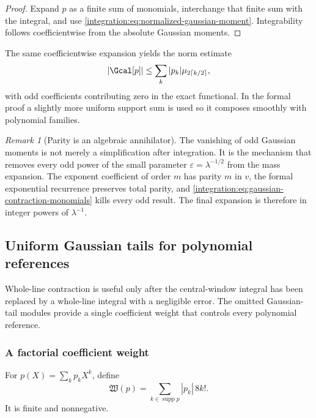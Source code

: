 \documentclass[11pt,oneside]{article}
\theoremstyle{definition}
\theoremstyle{remark}
\newtheorem{remark}[remark]{Remark}
\newcommand{\supp}{\operatorname{supp}}
\begin{document}
\begin{proof}
Expand $p$ as a finite sum of monomials, interchange that finite sum with the integral, and
use \eqref{integration:eq:normalized-gaussian-moment}.  Integrability follows coefficientwise from the
absolute Gaussian moments.
\end{proof}

The same coefficientwise expansion yields the norm estimate
\begin{equation}
 \left|\Gcal[p]\right|
 \le\sum_k|p_k|\mu_{2\lceil k/2\rceil},
 \label{integration:eq:gaussian-contraction-norm-bound}
\end{equation}
with odd coefficients contributing zero in the exact functional.  In the formal proof a
slightly more uniform support sum is used so it composes smoothly with polynomial families.

\begin{remark}[Parity is an algebraic annihilator]
The vanishing of odd Gaussian moments is not merely a simplification after integration.  It
is the mechanism that removes every odd power of the small parameter $\varepsilon=
\lambda^{-1/2}$ from the mass expansion.  The exponent coefficient of order $m$ has parity
$m$ in $v$, the formal exponential recurrence preserves total parity, and
\eqref{integration:eq:gaussian-contraction-monomials} kills every odd result.  The final expansion is
therefore in integer powers of $\lambda^{-1}$.
\end{remark}

\subsection{Uniform Gaussian tails for polynomial references}
\label{integration:sec:gaussian-tails}

Whole-line contraction is useful only after the central-window integral has been replaced by
a whole-line integral with a negligible error.  The omitted Gaussian-tail modules provide a
single coefficient weight that controls every polynomial reference.

\subsubsection{A factorial coefficient weight}

For $p(X)=\sum_kp_kX^k$, define
\begin{equation}
 \mathfrak W(p)=\sum_{k\in\supp p}|p_k|\,8k!.
 \label{integration:eq:gaussian-tail-weight}
\end{equation}
It is finite and nonnegative.
\end{document}
